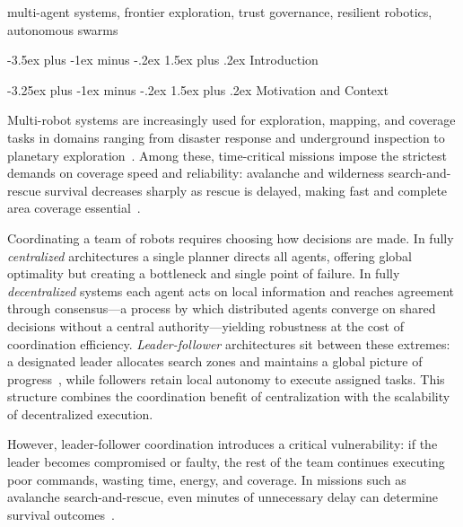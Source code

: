 \documentclass[conference]{IEEEtran}
\makeatletter
\renewcommand{\section}{\@startsection{section}{1}{\z@}%
  {-3.5ex plus -1ex minus -.2ex}%
  {1.5ex plus .2ex}%
  {\normalfont\large\bfseries\centering}}
\renewcommand{\subsection}{\@startsection{subsection}{2}{\z@}%
  {-3.25ex plus -1ex minus -.2ex}%
  {1.5ex plus .2ex}%
  {\normalfont\normalsize\itshape\centering}}
\makeatother
\begin{document}
\begin{IEEEkeywords}
multi-agent systems, frontier exploration, trust governance, resilient robotics, autonomous swarms
\end{IEEEkeywords}

\section{Introduction}
\label{sec:introduction}

\subsection{Motivation and Context}

Multi-robot systems are increasingly used for exploration, mapping, and coverage tasks in domains ranging from disaster response and underground inspection to planetary exploration~\cite{queralta2020sar, murphy2004rescue, chung2023darpa}. Among these, time-critical missions impose the strictest demands on coverage speed and reliability: avalanche and wilderness search-and-rescue survival decreases sharply as rescue is delayed, making fast and complete area coverage essential~\cite{rauch2024avalanche}.

Coordinating a team of robots requires choosing how decisions are made. In fully \emph{centralized} architectures a single planner directs all agents, offering global optimality but creating a bottleneck and single point of failure. In fully \emph{decentralized} systems each agent acts on local information and reaches agreement through consensus---a process by which distributed agents converge on shared decisions without a central authority---yielding robustness at the cost of coordination efficiency. \emph{Leader-follower} architectures sit between these extremes: a designated leader allocates search zones and maintains a global picture of progress~\cite{yamauchi1997frontier, burgard2000collaborative, simmons2000coordination}, while followers retain local autonomy to execute assigned tasks. This structure combines the coordination benefit of centralization with the scalability of decentralized execution.

However, leader-follower coordination introduces a critical vulnerability: if the leader becomes compromised or faulty, the rest of the team continues executing poor commands, wasting time, energy, and coverage. In missions such as avalanche search-and-rescue, even minutes of unnecessary delay can determine survival outcomes~\cite{rauch2024avalanche}.
\end{document}
